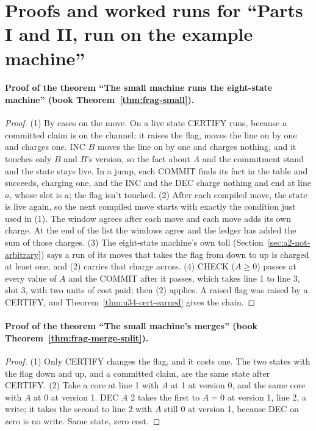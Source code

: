 \documentclass[11pt,twoside]{article}
\theoremstyle{thielethm}
\theoremstyle{thieledef}
\theoremstyle{thieledef}
\theoremstyle{thieledef}
\theoremstyle{thielethm}
\theoremstyle{thieleobs}
\theoremstyle{thielethm}
\begin{document}
\section{Proofs and worked runs for ``Parts I and II, run on the example machine''}

\paragraph{Proof of the theorem ``The small machine runs the eight-state machine'' (book Theorem~\ref{thm:frag-small}).}
\begin{proof}
(1) By cases on the move. On a live state CERTIFY runs, because a committed claim is on the channel;
it raises the flag, moves the line on by one and charges one. INC $B$ moves the line on by one and
charges nothing, and it touches only $B$ and $B$'s version, so the fact about $A$ and the
commitment stand and the state stays live. In a jump, each COMMIT finds its fact in the table and
succeeds, charging one, and the INC and the DEC charge nothing and end at line $a$, whose slot is $a$;
the flag isn't touched. (2) After each compiled move, the state is live again,
so the next compiled move starts with exactly the condition just used in (1).
The window agrees after each move and each move adds its own charge. At the end
of the list the windows agree and the ledger has added the sum of those charges.
(3) The eight-state machine's own
toll (Section~\ref{sec:a2-not-arbitrary}) says a run of its moves that takes the flag from down to
up is charged at least one, and (2) carries that charge across. (4) CHECK ($A \ge 0$) passes at
every value of $A$ and the COMMIT after it passes, which takes line 1 to line 3, slot 3, with two
units of cost paid; then (2) applies. A raised flag was raised by a CERTIFY, and
Theorem~\ref{thm:u34-cert-earned} gives the chain.
\end{proof}

\paragraph{Proof of the theorem ``The small machine's merges'' (book Theorem~\ref{thm:frag-merge-split}).}
\begin{proof}
(1) Only CERTIFY changes the flag, and it costs one. The two states with the flag down and up, and
a committed claim, are the same state after CERTIFY. (2) Take a core at line 1 with $A$ at 1 at
version 0, and the same core with $A$ at 0 at version 1. DEC $A$ 2 takes the first to $A = 0$ at
version 1, line 2, a write; it takes the second to line 2 with $A$ still 0 at version 1, because
DEC on zero is no write. Same state, zero cost.
\end{proof}
\end{document}
